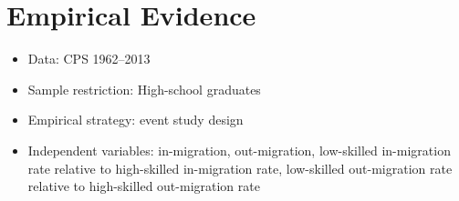 \documentclass[a4paper, 12pt]{article}
\begin{document}
\section{Empirical Evidence}
\begin{itemize}
\item Data: CPS 1962--2013
\item Sample restriction: High-school graduates
\item Empirical strategy: event study design
\item Independent variables: in-migration, out-migration, low-skilled in-migration rate relative to high-skilled in-migration rate, low-skilled out-migration rate relative to high-skilled out-migration rate
\end{itemize}
\end{document}

